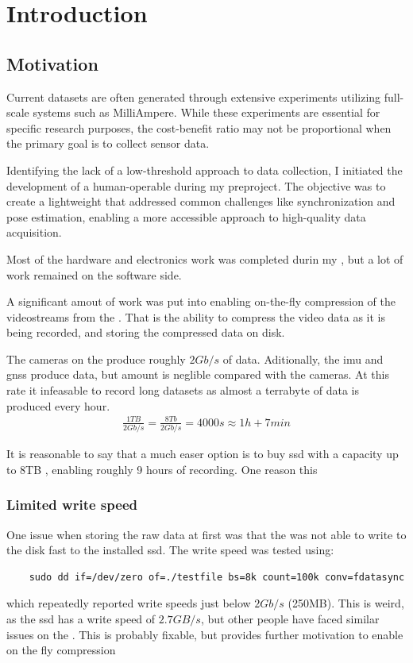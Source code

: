 \chapter{Introduction}

\section{Motivation}
Current datasets are often generated through extensive experiments utilizing full-scale systems such as MilliAmpere. While these experiments are essential for specific research purposes, the cost-benefit ratio may not be proportional when the primary goal is to collect sensor data.

Identifying the lack of a low-threshold approach to data collection, I initiated the development of a human-operable \sr during my preproject. The objective was to create a lightweight \sr that addressed common challenges like synchronization and pose estimation, enabling a more accessible approach to high-quality data acquisition.

Most of the hardware and electronics work was completed durin my \preproject, but a lot of work remained on the software side.

A significant amout of work was put into enabling on-the-fly compression of the videostreams from the \sr.
That is the ability to compress the video data as it is being recorded, and storing the compressed data on disk.

The cameras on the \sr produce roughly $2Gb/s$ of data.
Aditionally, the \gls{imu} and \gls{gnss} produce data, but amount is neglible compared with the cameras.
At this rate it infeasable to record long datasets as almost a terrabyte of data is produced every hour.
\begin{align}
    \frac{1TB}{2Gb/s}  = \frac{8Tb}{2Gb/s} = 4000s \approx 1h + 7min
\end{align}

It is reasonable to say that a much easer option is to buy \gls{ssd} with a capacity up to 8TB \cite{CorsairMP600PRO}, enabling roughly 9 hours of recording.
One reason this
\cite{microntechnologyMicron2300SSD2020}

\subsection{Limited write speed}
One issue when storing the raw data at first was that the \jx was not able to write to the disk fast to the installed \gls{ssd}.
The write speed was tested using:
\begin{verbatim}
    sudo dd if=/dev/zero of=./testfile bs=8k count=100k conv=fdatasync
\end{verbatim}
which repeatedly reported write speeds just below $2Gb/s$ (250MB).
This is weird, as the \gls{ssd} has a write speed of $2.7GB/s$, but other people have faced similar issues on the \jx \cite{microntechnologyMicron2300SSD2020} \cite{dtyuImbalancedPerformanceRead2018}.
This is probably fixable, but provides further motivation to enable on the fly compression

